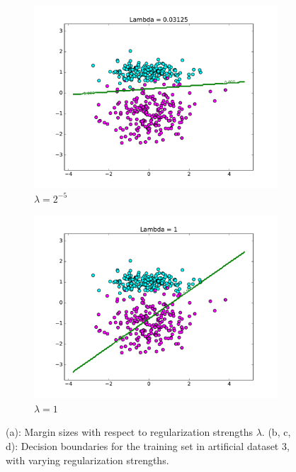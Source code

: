 \documentclass[10pt,psamsfonts]{amsart}
\theoremstyle{definition}
\theoremstyle{remark}
\numberwithin{equation}{section}
\begin{document}
\begin{figure}
\begin{subfigure}[b]{0.23\textwidth}
		\includegraphics[width=\textwidth]{hw2_3-2_6.pdf}
		\caption{$\lambda = 2^{-5}$}
	\end{subfigure}
	\begin{subfigure}[b]{0.23\textwidth}
		\includegraphics[width=\textwidth]{hw2_3-2_1.pdf}
		\caption{$\lambda = 1$}
	\end{subfigure}
	\caption{(a): Margin sizes with respect to regularization strengths $\lambda$. (b, c, d): Decision boundaries for the training set in artificial dataset 3, with varying regularization strengths.}
\end{figure}
\end{document}
